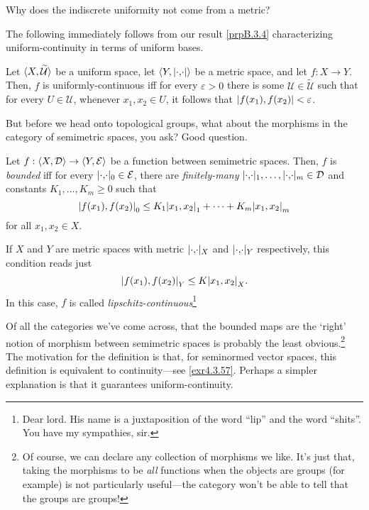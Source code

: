 \begin{exr}
Why does the indiscrete uniformity not come from a metric?
\end{exr}
The following immediately follows from our result \cref{prpB.3.4} characterizing uniform-continuity in terms of uniform bases.
\begin{prp}\label{prp4.8.54}
Let $\langle X,\widetilde{\mathcal{U}}\rangle$ be a uniform space, let $\coord{Y,\metric}$ be a metric space, and let $f:X\rightarrow Y$.  Then, $f$ is uniformly-continuous iff for every $\varepsilon >0$ there is some $\mathcal{U}\in \widetilde{\mathcal{U}}$ such that for every $U\in \mathcal{U}$, whenever $x_1,x_2\in U$, it follows that $\metric[f(x_1)][f(x_2)]<\varepsilon$.
\end{prp}

But before we head onto topological groups, what about the morphisms in the category of semimetric spaces, you ask?  Good question.
\begin{dfn}\label{BoundedMap}
Let $f:\langle X,\mathcal{D}\rangle\rightarrow \langle Y,\mathcal{E}\rangle$ be a function between semimetric spaces.  Then, $f$ is \emph{bounded} iff for every $\metric _0\in \mathcal{E}$, there are \emph{finitely-many} $\metric _1,\ldots ,\metric _m\in \mathcal{D}$ and constants $K_1,\ldots ,K_m\geq 0$ such that
\begin{equation}
\metric[f(x_1)][f(x_2)]_0\leq K_1\metric[x_1][x_2]_1+\cdots +K_m\metric[x_1][x_2]_m
\end{equation}
for all $x_1,x_2\in X$.
\begin{rmk}
If $X$ and $Y$ are metric spaces with metric $\metric _X$ and $\metric _Y$ respectively, this condition reads just
\begin{equation}
\metric[f(x_1)][f(x_2)]_Y\leq K\metric[x_1][x_2]_X.
\end{equation}
In this case, $f$ is called \emph{lipschitz-continuous}\footnote{Dear lord.  His name is a juxtaposition of the word ``lip'' and the word ``shits''.  You have my sympathies, sir\textellipsis .}
\end{rmk}
\begin{rmk}
Of all the categories we've come across, that the bounded maps are the `right' notion of morphism between semimetric spaces is probably the least obvious.\footnote{Of course, we can declare any collection of morphisms we like.  It's just that, taking the morphisms to be \emph{all} functions when the objects are groups (for example) is not particularly useful---the category won't be able to tell that the groups are groups!}  The motivation for the definition is that, for seminormed vector spaces, this definition is equivalent to continuity---see \cref{exr4.3.57}.  Perhaps a simpler explanation is that it guarantees uniform-continuity.
\end{rmk}
\end{dfn}
